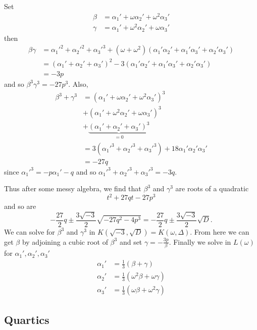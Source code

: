 \documentclass[a4paper]{article}
\begin{document}
Set
\begin{align*}
  \beta &= \alpha_1' + \omega \alpha_2' + \omega^2 \alpha_3' \\
  \gamma &= \alpha_1' + \omega^2 \alpha_2' + \omega \alpha_3'
\end{align*}
then
\begin{align*}
  \beta \gamma &= \alpha_1'^2 + \alpha_2'^2 + \alpha_3'^3 + (\omega + \omega^2)(\alpha_1'\alpha_2' + \alpha_1'\alpha_3' + \alpha_2'\alpha_3') \\
               &= (\alpha_1' + \alpha_2' + \alpha_3')^2 - 3(\alpha_1'\alpha_2' + \alpha_1'\alpha_3' + \alpha_2'\alpha_3') \\
               &= -3p
\end{align*}
and so \(\beta^3\gamma^3 = -27p^3\). Also,
\begin{align*}
  \beta^3 + \gamma^3 &= (\alpha_1' + \omega\alpha_2' + \omega^2\alpha_3')^3 \\
                     &+ (\alpha_1' + \omega^2\alpha_2' + \omega\alpha_3')^3 \\
                     &+ \underbrace{(\alpha_1' + \alpha_2' + \alpha_3')^3}_{= 0} \\
                     &= 3(\alpha_1'^3 + \alpha_2'^3 + \alpha_3'^3) + 18\alpha_1'\alpha_2'\alpha_3' \\
                     &= -27q
\end{align*}
since \(\alpha_1'^3 = -p\alpha_1' - q\) and so \(\alpha_1'^3 + \alpha_2'^3 + \alpha_3'^3 = -3q\).

Thus after some messy algebra, we find that \(\beta^3\) and \(\gamma^3\) are roots of a quadratic
\[
  t^2 + 27qt - 27p^3
\]
and so are
\[
  -\frac{27}{2}q \pm \frac{3\sqrt{-3}}{2}\sqrt{-27q^2 - 4p^3} = -\frac{27}{2}q \pm \frac{3\sqrt{-3}}{2}\sqrt D.
\]
We can solve for \(\beta^3\) and \(\gamma^3\) in \(K(\sqrt{-3}, \sqrt D) = K(\omega, \Delta)\). From here we can get \(\beta\) by adjoining a cubic root of \(\beta^3\) and set \(\gamma = -\frac{3p}{\beta}\). Finally we solve in \(L(\omega)\) for \(\alpha_1', \alpha_2', \alpha_3'\)
\begin{align*}
  \alpha_1' &= \frac{1}{3}(\beta + \gamma) \\
  \alpha_2' &= \frac{1}{3}(\omega^2\beta + \omega\gamma) \\
  \alpha_3' &= \frac{1}{3}(\omega\beta + \omega^2\gamma)
\end{align*}

\subsection{Quartics}
\end{document}
